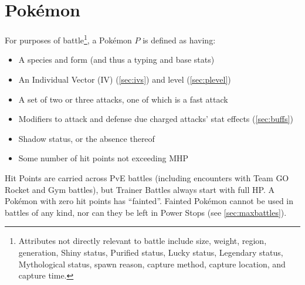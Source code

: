 \chapter{Pokémon}
\label{chap:pokemon}
For purposes of battle\footnote{Attributes not directly relevant to battle include size, weight, region,
generation, Shiny status, Purified status, Lucky status, Legendary status, Mythological status, spawn
reason, capture method, capture location, and capture time.}, a Pokémon $P$ is defined as having:
\begin{itemize}
\item A species and form (and thus a typing and base stats)
\item An Individual Vector (IV) (\autoref{sec:ivs}) and level (\autoref{sec:plevel})
\item A set of two or three attacks, one of which is a fast attack
\item Modifiers to attack and defense due charged attacks' stat effects (\autoref{sec:buffs})
\item Shadow status, or the absence thereof
\item Some number of hit points not exceeding MHP
\end{itemize}
Hit Points are carried across PvE battles (including encounters with
  Team GO Rocket and Gym battles), but Trainer Battles always start with full HP\@.
A Pokémon with zero hit points has ``fainted''.
Fainted Pokémon cannot be used in battles of any kind, nor can they be left in
 Power Stops (see \autoref{sec:maxbattles}).

